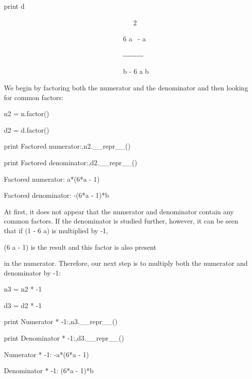 \documentclass[12pt,oneside]{book}
\begin{document}
print d

{\textbar}

\ \ \ \ \ \ \ \ \ \ \ \ \ \ \ \ \ \ \ \ \ \ \ \ \ \ \ \ \ \ \ \ \ \ \ \ \ \ 2

\ \ \ \ \ \ \ \ \ \ \ \ \ \ \ \ \ \ \ \ \ \ \ \ \ \ \ \ \ \ \ \ \ \ \ 6
a \ {}- a

\ \ \ \ \ \ \ \ \ \ \ \ \ \ \ \ \ \ \ \ \ \ \ \ \ \ \ \ \ \ \ \ \ \ \ {}-{}-{}-{}-{}-{}-{}-{}-{}-

\ \ \ \ \ \ \ \ \ \ \ \ \ \ \ \ \ \ \ \ \ \ \ \ \ \ \ \ \ \ \ \ \ \ \ b
{}- 6 a b


{\textquotedbl}{\textquotedbl}{\textquotedbl}

We begin by factoring both the numerator and the denominator and then looking for common factors:

{\textquotedbl}{\textquotedbl}{\textquotedbl}

n2 = n.factor()

d2 = d.factor()

print {\textquotedbl}Factored numerator:{\textquotedbl},n2.\_\_repr\_\_()

print {\textquotedbl}Factored denominator:{\textquotedbl},d2.\_\_repr\_\_()

{\textbar}

Factored numerator: a*(6*a {}- 1)

Factored denominator: {}-(6*a {}- 1)*b


{\textquotedbl}{\textquotedbl}{\textquotedbl}

At first, it does not appear that the numerator and denominator contain any common factors. If the denominator is studied further, however, it can be seen that if (1 {}- 6 a) is multiplied by {}-1, 

(6 a {}- 1) is the result and this factor is also present

in the numerator. Therefore, our next step is to multiply both the numerator and denominator by {}-1:

{\textquotedbl}{\textquotedbl}{\textquotedbl}

n3 = n2 * {}-1

d3 = d2 * {}-1

print {\textquotedbl}Numerator * {}-1:{\textquotedbl},n3.\_\_repr\_\_()

print {\textquotedbl}Denominator * {}-1:{\textquotedbl},d3.\_\_repr\_\_()

{\textbar}

Numerator * {}-1: {}-a*(6*a {}- 1)

Denominator * {}-1: (6*a {}- 1)*b
\end{document}
